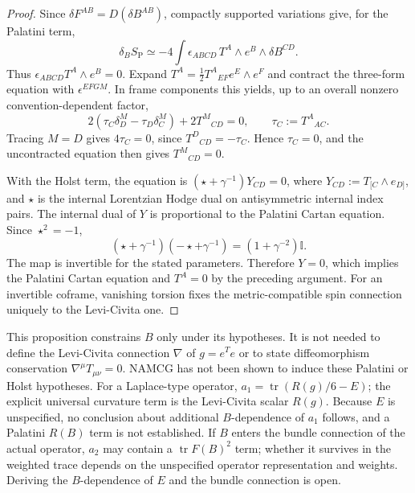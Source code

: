 \begin{proof}
  Since \(\delta F^{AB}=D(\delta B^{AB})\), compactly supported
  variations give, for the Palatini term,
  \[
    \delta_B S_{\mathrm P}
    \simeq -4\int \epsilon_{ABCD}\,
       T^A\wedge e^B\wedge\delta B^{CD}.
  \]
  Thus \(\epsilon_{ABCD}T^A\wedge e^B=0\). Expand
  \(T^A=\tfrac12T^A{}_{EF}e^E\wedge e^F\) and contract the
  three-form equation with \(\epsilon^{EFGM}\). In frame components
  this yields, up to an overall nonzero convention-dependent factor,
  \[
    2(\tau_C\delta_D^M-\tau_D\delta_C^M)
       +2T^M{}_{CD}=0,\qquad
    \tau_C:=T^A{}_{AC}.
  \]
  Tracing \(M=D\) gives \(4\tau_C=0\), since
  \(T^D{}_{CD}=-\tau_C\). Hence \(\tau_C=0\), and the uncontracted
  equation then gives \(T^M{}_{CD}=0\).

  With the Holst term, the equation is
  \((\star+\gamma^{-1})Y_{CD}=0\), where
  \(Y_{CD}:=T_{[C}\wedge e_{D]}\), and \(\star\) is the internal
  Lorentzian Hodge dual on antisymmetric internal index pairs. The
  internal dual of \(Y\) is proportional to the Palatini Cartan
  equation. Since \(\star^2=-1\),
  \[
    (\star+\gamma^{-1})(-\star+\gamma^{-1})
    =(1+\gamma^{-2})\mathbb I.
  \]
  The map is invertible for the stated parameters. Therefore
  \(Y=0\), which implies the Palatini Cartan
  equation and \(T^A=0\) by the preceding argument. For an
  invertible coframe, vanishing torsion fixes the metric-compatible
  spin connection uniquely to the Levi-Civita one.
\end{proof}

\begin{remark}
  This proposition constrains \(B\) only under its hypotheses. It is
  not needed to define the Levi-Civita connection \(\nabla\) of
  \(g=e^T e\) or to state diffeomorphism conservation
  \(\nabla^\mu T_{\mu\nu}=0\). NAMCG has not been shown to induce
  these Palatini or Holst hypotheses. For a Laplace-type operator,
  \(a_1=\operatorname{tr}(R(g)/6-E)\); the explicit universal
  curvature term is the Levi-Civita scalar \(R(g)\). Because \(E\)
  is unspecified, no conclusion about additional \(B\)-dependence
  of \(a_1\) follows, and a Palatini \(R(B)\) term is not
  established. If \(B\) enters the bundle connection of the actual
  operator, \(a_2\) may contain a
  \(\operatorname{tr}F(B)^2\) term; whether it survives in the
  weighted trace depends on the unspecified operator
  representation and weights. Deriving the \(B\)-dependence of
  \(E\) and the bundle connection is open.
\end{remark}

